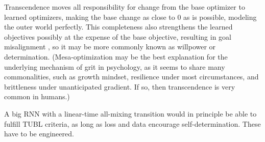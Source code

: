 \documentclass{article}
\begin{document}
Transcendence moves all responsibility for change from the base optimizer to learned optimizers, making the base change as close to 0 as is possible, modeling the outer world perfectly. This completeness also strengthens the learned objectives possibly at the expense of the base objective, resulting in goal misalignment \cite{hubinger2019risks}, so it may be more commonly known as willpower or determination. (Mesa-optimization may be the best explanation for the underlying mechanism of grit \cite{Kannangara2018AllTG} in psychology, as it seems to share many commonalities, such as growth mindset, resilience under most circumstances, and brittleness under unanticipated gradient. If so, then transcendence is very common in humans.)

A big RNN with a linear-time all-mixing transition would in principle be able to fulfill TUBL criteria, as long as loss and data encourage self-determination. These have to be engineered.
\end{document}
